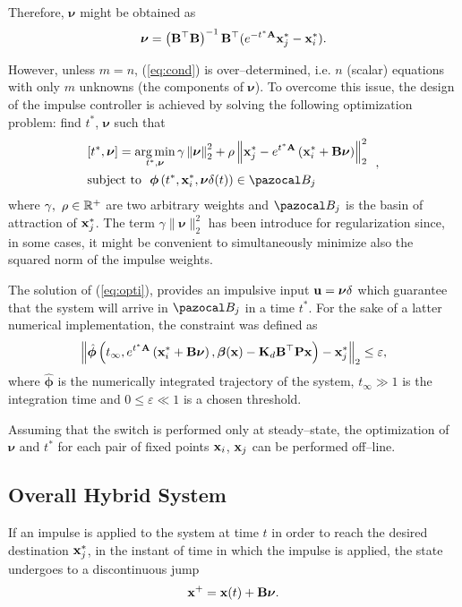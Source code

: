 Therefore, $\bm\nu$ might be obtained as
\begin{align}
    \bm\nu = \left(\mathbf{B}^\top\mathbf{B}\right)^{-1}\mathbf{B}^\top(e^{-t^*\mathbf{A}}\mathbf{x}_j^*-\mathbf{x}_i^*).
\end{align}
%

However, unless $m = n$, (\ref{eq:cond}) is over--determined, i.e. $n$ (scalar) equations with only $m$ unknowns (the components of $\bm\nu$). 
To overcome this issue, the design of the impulse controller is achieved by solving the following optimization problem: 
find $t^*$, $\bm\nu$ such that 
%
\begin{equation}\label{eq:opti}
\begin{aligned}
& [t^*,\bm\nu] = \argmin\limits_{t^*,\bm\nu}\gamma\left\|\bm\nu \right\|^2_2+\rho\left\|\xb_j^* - e^{t^*\Ab}\left(\xb_i^*+\Bb\bm\nu\right)\right\|^2_2\\
& \text{subject to} ~~\bm\phi\left(t^*,\xb_i^*,\bm\nu\delta(t)\right)\in\B_j
\end{aligned}~~,
\end{equation}
where $\gamma,~\rho\in \mathbb{R}^+$ are two arbitrary weights and  $\B_j$ is the basin of attraction of $\mathbf{x}_j^*$. 
The term $\gamma\|\bm\nu\|_2^2$ has been introduce for regularization since, in some cases, it might be convenient to simultaneously minimize also the squared norm of the impulse weights.
%

The solution of (\ref{eq:opti}), provides an impulsive input  $\mathbf{u} = \bm\nu\delta$ which guarantee that the system will arrive in $\B_j$ in a time $t^*$.  
For the sake of a latter numerical implementation, the constraint was defined as
\begin{align}
    \left\|\hat{\bm\phi}\left(t_{\infty},e^{t^*\mathbf{A}}\left(\mathbf{x}_i^*+\mathbf{B}\bm\nu\right),\bm\beta(\mathbf{x})-\mathbf{K}_d\mathbf{B}^\top \mathbf{P}\mathbf{x}\right)-\mathbf{x}^*_j\right\|_2\leq\varepsilon,
\end{align}
%
where $\hat{\bm\phi}$ is the numerically integrated trajectory of the system, $t_\infty\gg 1$ is the integration time and $0\leq\varepsilon \ll 1$ is a chosen threshold.
%
\begin{rem}
	Assuming that the switch is performed only at steady--state, the optimization of $\bm\nu$ and $t^*$ for each pair of fixed points $\mathbf{x}_i$, $\mathbf{x}_j$ can be performed off--line.
\end{rem}
%
\subsection{Overall Hybrid System}
%
If an impulse is applied to the system at time $t$  in order to reach the desired destination $\mathbf{x}_j^*$, in the instant of time in which the impulse is applied, the state undergoes to a discontinuous jump
%
\begin{equation}\label{eq:jump}
    \mathbf{x}^+ = \mathbf{x}(t) + \mathbf{B}\bm\nu.
\end{equation}
%

